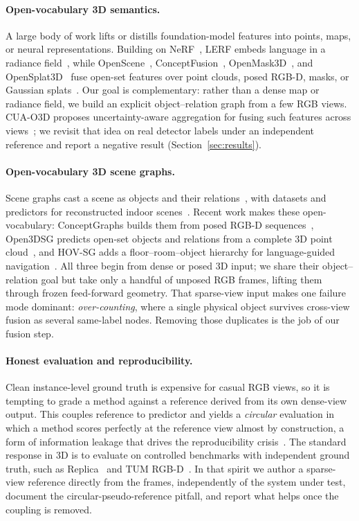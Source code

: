 \paragraph{Open-vocabulary 3D semantics.}
A large body of work lifts or distills foundation-model features into points, maps, or neural representations. Building on NeRF~\cite{mildenhall2020nerf}, LERF embeds language in a radiance field~\cite{kerr2023lerf}, while OpenScene~\cite{peng2023openscene}, ConceptFusion~\cite{jatavallabhula2023conceptfusion}, OpenMask3D~\cite{takmaz2023openmask3d}, and OpenSplat3D~\cite{piekenbrinck2025opensplat3d} fuse open-set features over point clouds, posed RGB-D, masks, or Gaussian splats~\cite{kerbl2023gaussian}. Our goal is complementary: rather than a dense map or radiance field, we build an explicit object--relation graph from a few RGB views. CUA-O3D proposes uncertainty-aware aggregation for fusing such features across views~\cite{li2025cuao3d}; we revisit that idea on real detector labels under an independent reference and report a negative result (Section~\ref{sec:results}).

\paragraph{Open-vocabulary 3D scene graphs.}
Scene graphs cast a scene as objects and their relations~\cite{armeni2019scenegraph}, with datasets and predictors for reconstructed indoor scenes~\cite{wald2020threedssg,dai2017scannet}. Recent work makes these open-vocabulary: ConceptGraphs builds them from posed RGB-D sequences~\cite{gu2024conceptgraphs}, Open3DSG predicts open-set objects and relations from a complete 3D point cloud~\cite{koch2024open3dsg}, and HOV-SG adds a floor--room--object hierarchy for language-guided navigation~\cite{werby2024hovsg}. All three begin from dense or posed 3D input; we share their object--relation goal but take only a handful of unposed RGB frames, lifting them through frozen feed-forward geometry. That sparse-view input makes one failure mode dominant: \emph{over-counting}, where a single physical object survives cross-view fusion as several same-label nodes. Removing those duplicates is the job of our fusion step.

\paragraph{Honest evaluation and reproducibility.}
Clean instance-level ground truth is expensive for casual RGB views, so it is tempting to grade a method against a reference derived from its own dense-view output. This couples reference to predictor and yields a \emph{circular} evaluation in which a method scores perfectly at the reference view almost by construction, a form of information leakage that drives the reproducibility crisis~\cite{kapoor2023leakage,gundersen2018reproducibility}. The standard response in 3D is to evaluate on controlled benchmarks with independent ground truth, such as Replica~\cite{straub2019replica} and TUM RGB-D~\cite{sturm2012tumrgbd}. In that spirit we author a sparse-view reference directly from the frames, independently of the system under test, document the circular-pseudo-reference pitfall, and report what helps once the coupling is removed.
